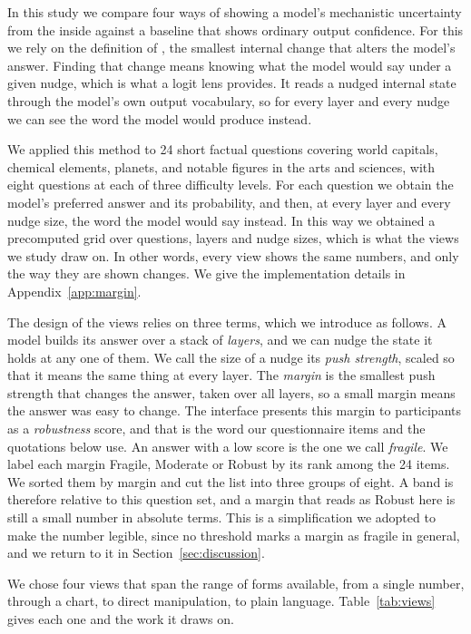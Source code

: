 \documentclass[sigconf]{acmart}
\begin{document}
In this study we compare four ways of showing a model's mechanistic uncertainty from the inside against a
baseline that shows ordinary output confidence. For this we rely on the definition of
\citet{komanduriMeasuringMechanisticUncertainty2026}, the smallest internal change that alters the model's
answer. Finding that change means knowing what the model would say under a given nudge, which is what a logit
lens provides. It reads a nudged internal state through the model's own output vocabulary, so for every layer
and every nudge we can see the word the model would produce instead.

We applied this method to 24 short factual questions covering world capitals, chemical elements, planets, and
notable figures in the arts and sciences, with eight questions at each of three difficulty levels. For each
question we obtain the model's preferred answer and its probability, and then, at every layer and every nudge
size, the word the model would say instead. In this way we obtained a precomputed grid over questions, layers
and nudge sizes, which is what the views we study draw on. In other words, every view shows the same numbers,
and only the way they are shown changes. We give the implementation details in Appendix~\ref{app:margin}.

The design of the views relies on three terms, which we introduce as follows. A model builds its answer over a
stack of \emph{layers}, and we can nudge the state it holds at any one of them. We call the size of a nudge its
\emph{push strength}, scaled so that it means the same thing at every layer. The \emph{margin} is the smallest
push strength that changes the answer, taken over all layers, so a small margin means the answer was easy to
change. The interface presents this margin to participants as a \emph{robustness} score, and that is the word
our questionnaire items and the quotations below use. An answer with a low score is the one we call
\emph{fragile}. We label each margin Fragile, Moderate or Robust by its rank among the 24 items. We sorted them
by margin and cut the list into three groups of eight. A band is therefore relative to this question set, and a
margin that reads as Robust here is still a small number in absolute terms. This is a simplification we adopted
to make the number legible, since no threshold marks a margin as fragile in general, and we return to it in
Section~\ref{sec:discussion}.

We chose four views that span the range of forms available, from a single number, through a chart, to direct
manipulation, to plain language. Table~\ref{tab:views} gives each one and the work it draws on.
\end{document}
